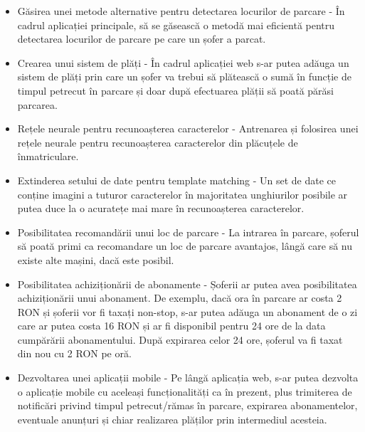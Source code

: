 \documentclass[12pt]{article}
\begin{document}
\begin{itemize}
    \item G\u{a}sirea unei metode alternative pentru detectarea locurilor de parcare - \^{I}n cadrul aplicației principale, s\u{a} se g\u{a}seasc\u{a} o metod\u{a} mai eficient\u{a} pentru detectarea locurilor de parcare pe care un șofer a parcat.
    \item Crearea unui sistem de pl\u{a}ți - \^{I}n cadrul aplicației web s-ar putea ad\u{a}uga un sistem de pl\u{a}ți prin care un șofer va trebui s\u{a} pl\u{a}teasc\u{a} o sum\u{a} \^{i}n funcție de timpul petrecut \^{i}n parcare și doar dup\u{a} efectuarea pl\u{a}ții s\u{a} poat\u{a} p\u{a}r\u{a}si parcarea.
    \item Rețele neurale pentru recunoașterea caracterelor - Antrenarea și folosirea unei rețele neurale pentru recunoașterea caracterelor din pl\u{a}cuțele de \^{i}nmatriculare.
    \item Extinderea setului de date pentru template matching - Un set de date ce conține imagini a tuturor caracterelor \^{i}n majoritatea unghiurilor posibile ar putea duce la o acuratețe mai mare \^{i}n recunoașterea caracterelor.
    \item Posibilitatea recomand\u{a}rii unui loc de parcare - La intrarea \^{i}n parcare, șoferul s\u{a} poat\u{a} primi ca recomandare un loc de parcare avantajos, l\^{a}ng\u{a} care s\u{a} nu existe alte mașini, dac\u{a} este posibil.
    \item Posibilitatea achizițion\u{a}rii de abonamente - Șoferii ar putea avea posibilitatea achizițion\u{a}rii unui abonament. De exemplu, dac\u{a} ora \^{i}n parcare ar costa 2 RON și șoferii vor fi taxați non-stop, s-ar putea ad\u{a}uga un abonament de o zi care ar putea costa 16 RON și ar fi disponibil pentru 24 ore de la data cump\u{a}r\u{a}rii abonamentului. Dup\u{a} expirarea celor 24 ore, șoferul va fi taxat din nou cu 2 RON pe or\u{a}.
    \item Dezvoltarea unei aplicații mobile - Pe l\^{a}ng\u{a} aplicația web, s-ar putea dezvolta o aplicație mobile cu aceleași funcționalit\u{a}ți ca \^{i}n prezent, plus trimiterea de notific\u{a}ri privind timpul petrecut/r\u{a}mas \^{i}n parcare, expirarea abonamentelor, eventuale anunțuri și chiar realizarea pl\u{a}ților prin intermediul acesteia.
\end{itemize}
\end{document}

